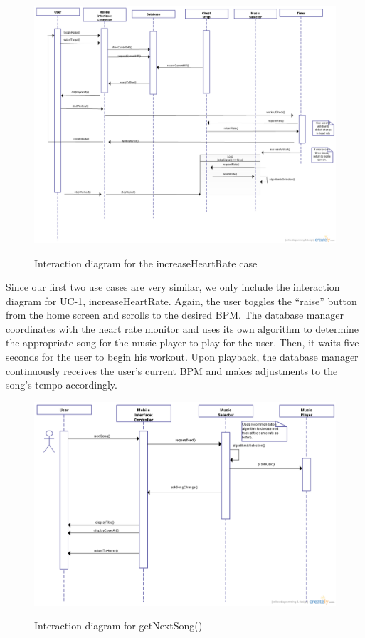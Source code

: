 \documentclass[letterpaper,english, 12pt]{scrreprt}
\begin{document}
\begin{figure}[H]
	\centering
	\includegraphics[scale=.35]{img/Interaction_Diagrams/newUC1.png}\\
	\caption {Interaction diagram for the increaseHeartRate case} 
\end{figure}


Since our first two use cases are very similar, we only include the interaction diagram for UC-1, increaseHeartRate. Again, the user toggles the ``raise'' button from the home screen and scrolls to the desired BPM. The database manager coordinates with the heart rate monitor and uses its own algorithm to determine the appropriate song for the music player to play for the user. Then, it waits five seconds for the user to begin his workout. Upon playback, the database manager continuously receives the user's current BPM and makes adjustments to the song's tempo accordingly.

\begin{figure}[H]
	\centering
	\includegraphics[scale=.40]{img/Interaction_Diagrams/newUC3.png}\\
	\caption {Interaction diagram for getNextSong()} 
\end{figure}
\end{document}

